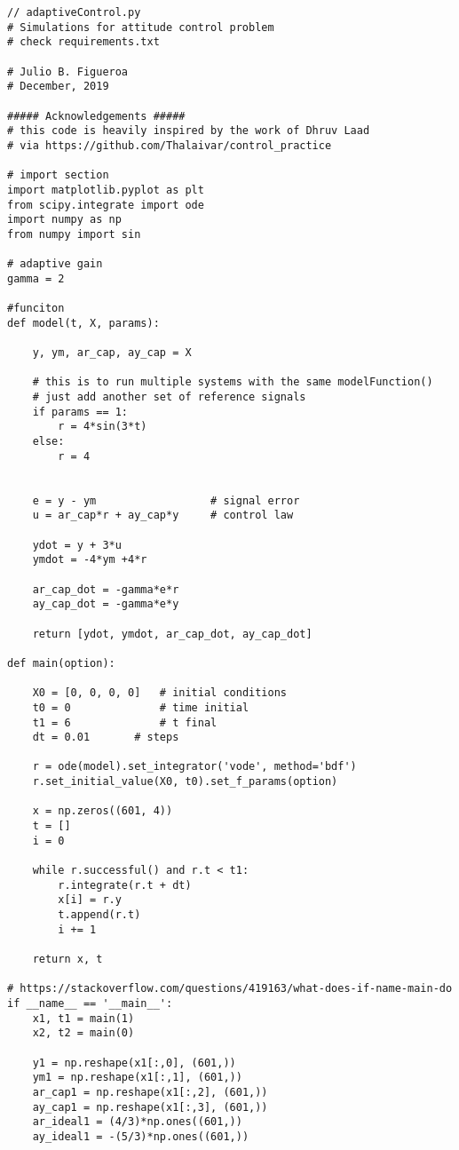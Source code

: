 \documentclass{article}
\begin{document}
\begin{lstlisting}
// adaptiveControl.py
# Simulations for attitude control problem
# check requirements.txt

# Julio B. Figueroa
# December, 2019

##### Acknowledgements #####
# this code is heavily inspired by the work of Dhruv Laad
# via https://github.com/Thalaivar/control_practice

# import section
import matplotlib.pyplot as plt
from scipy.integrate import ode
import numpy as np
from numpy import sin

# adaptive gain
gamma = 2

#funciton
def model(t, X, params):

    y, ym, ar_cap, ay_cap = X

    # this is to run multiple systems with the same modelFunction()
    # just add another set of reference signals
    if params == 1:
        r = 4*sin(3*t)
    else:
        r = 4


    e = y - ym                  # signal error
    u = ar_cap*r + ay_cap*y     # control law

    ydot = y + 3*u
    ymdot = -4*ym +4*r

    ar_cap_dot = -gamma*e*r
    ay_cap_dot = -gamma*e*y

    return [ydot, ymdot, ar_cap_dot, ay_cap_dot]

def main(option):

    X0 = [0, 0, 0, 0]   # initial conditions
    t0 = 0              # time initial
    t1 = 6              # t final
    dt = 0.01       # steps

    r = ode(model).set_integrator('vode', method='bdf')
    r.set_initial_value(X0, t0).set_f_params(option)

    x = np.zeros((601, 4))
    t = []
    i = 0

    while r.successful() and r.t < t1:
        r.integrate(r.t + dt)
        x[i] = r.y
        t.append(r.t)
        i += 1

    return x, t

# https://stackoverflow.com/questions/419163/what-does-if-name-main-do
if __name__ == '__main__':
    x1, t1 = main(1)
    x2, t2 = main(0)

    y1 = np.reshape(x1[:,0], (601,))
    ym1 = np.reshape(x1[:,1], (601,))
    ar_cap1 = np.reshape(x1[:,2], (601,))
    ay_cap1 = np.reshape(x1[:,3], (601,))
    ar_ideal1 = (4/3)*np.ones((601,))
    ay_ideal1 = -(5/3)*np.ones((601,))


\end{lstlisting}
\end{document}
